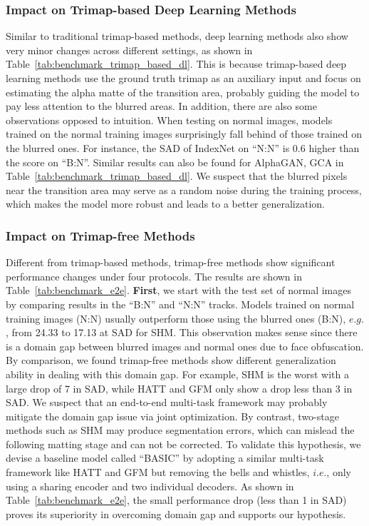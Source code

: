 \documentclass[sigconf]{acmart}
\begin{document}
\subsubsection{Impact on Trimap-based Deep Learning Methods}
Similar to traditional trimap-based methods, deep learning methods also show very minor changes across different settings, as shown in Table~\ref{tab:benchmark_trimap_based_dl}. This is because trimap-based deep learning methods use the ground truth trimap as an auxiliary input and focus on estimating the alpha matte of the transition area, probably guiding the model to pay less attention to the blurred areas. In addition, there are also some observations opposed to intuition. When testing on normal images, models trained on the normal training images surprisingly fall behind of those trained on the blurred ones. For instance, the SAD of IndexNet on ``N:N'' is 0.6 higher than the score on ``B:N''. Similar results can also be found for AlphaGAN, GCA in Table~\ref{tab:benchmark_trimap_based_dl}.
We suspect that the blurred pixels near the transition area may serve as a random noise during the training process, which makes the model more robust and leads to a better generalization. 

\subsubsection{Impact on Trimap-free Methods}
Different from trimap-based methods, trimap-free methods show significant performance changes under four protocols. The results are shown in Table~\ref{tab:benchmark_e2e}. \textbf{First}, we start with the test set of normal images by comparing results in the ``B:N'' and ``N:N'' tracks. Models trained on normal training images (N:N) usually outperform those using the blurred ones (B:N), $e.g.$, from 24.33 to 17.13 at SAD for SHM. This observation makes sense since there is a domain gap between blurred images and normal ones due to face obfuscation. By comparison, we found trimap-free methods show different generalization ability in dealing with this domain gap. For example, SHM is the worst with a large drop of 7 in SAD, while HATT and GFM only show a drop less than 3 in SAD. We suspect that an end-to-end multi-task framework may probably mitigate the domain gap issue via joint optimization. By contrast, two-stage methods such as SHM may produce segmentation errors, which can mislead the following matting stage and can not be corrected. To validate this hypothesis, we devise a baseline model called ``BASIC'' by adopting a similar multi-task framework like HATT and GFM but removing the bells and whistles, $i.e.$, only using a sharing encoder and two individual decoders. As shown in Table~\ref{tab:benchmark_e2e}, the small performance drop (less than 1 in SAD) proves its superiority in overcoming domain gap and supports our hypothesis.
\end{document}
